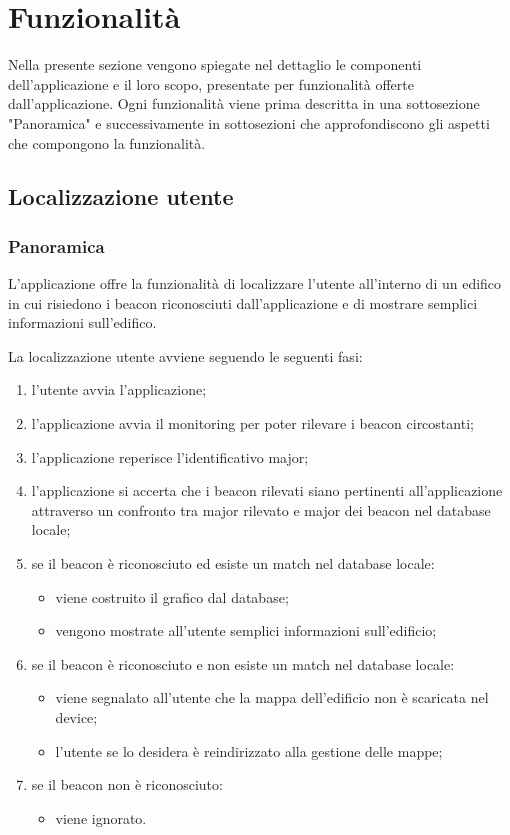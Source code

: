 \documentclass[../ManualeSviluppatore.tex]{subfiles}
\begin{document}
\section{Funzionalità}
	Nella presente sezione vengono spiegate nel dettaglio le componenti dell'applicazione e il loro scopo, presentate per funzionalità offerte dall'applicazione.
	Ogni funzionalità viene prima descritta in una sottosezione "Panoramica" e successivamente in sottosezioni che approfondiscono gli aspetti che compongono la funzionalità.

	\subsection{Localizzazione utente}
		
		\subsubsection{Panoramica}
			L'applicazione offre la funzionalità di localizzare l'utente all'interno di un edifico in cui risiedono i beacon riconosciuti dall'applicazione e di mostrare semplici informazioni sull'edifico.
			
			La localizzazione utente avviene seguendo le seguenti fasi:
			\begin{enumerate}
				\item l'utente avvia l'applicazione;
				\item l'applicazione avvia il monitoring per poter rilevare i beacon circostanti;
				\item l'applicazione reperisce l'identificativo major;
				\item l'applicazione si accerta che i beacon rilevati siano pertinenti all'applicazione attraverso un confronto tra major rilevato e major dei beacon nel database locale;
				\item se il beacon è riconosciuto ed esiste un match nel database locale:
					\begin{itemize}
						\item viene costruito il grafico dal database;
						\item vengono mostrate all'utente semplici informazioni sull'edificio;
					\end{itemize}
				\item se il beacon è riconosciuto e non esiste un match nel database locale:
					\begin{itemize}
						\item viene segnalato all'utente che la mappa dell'edificio non è scaricata nel device;
						\item l'utente se lo desidera è reindirizzato alla gestione delle mappe;
					\end{itemize}
				\item se il beacon non è riconosciuto:
					\begin{itemize}
						\item viene ignorato.
					\end{itemize}
			\end{enumerate}
			
\end{document}
